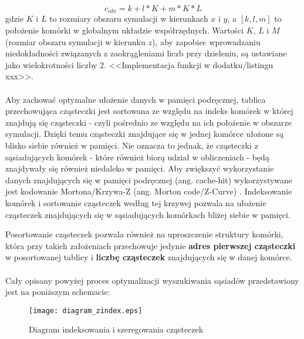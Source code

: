 \begin{equation}
c_{idx} = k + l * K + m * K * L
\label{eqn:get_cell_index}
\end{equation}
gdzie $K$ i $L$ to rozmiary obszaru symulacji w kierunkach $x$ i $y$, a $[k, l, m]$ to położenie komórki w globalnym układzie współrzędnych. Wartości $K$, $L$ i $M$ (rozmiar obszaru symulacji w kierunku $z$), aby zapobiec wprowadzaniu niedokładności związanych z zaokrągleniami liczb przy dzieleniu, są ustawiane jako wielokrotności liczby 2. <<Implementacja funkcji w dodatku/listingu xxx>>.

\paragraph{}
Aby zachować optymalne ułożenie danych w pamięci podręcznej, tablica przechowująca cząsteczki jest sortowana ze względu na indeks komórek w której znajdują się cząsteczki - czyli pośrednio ze względu na ich położenie w obszarze symulacji. Dzięki temu cząsteczki znajdujące się w jednej komórce ułożone są blisko siebie również w pamięci. Nie oznacza to jednak, że cząsteczki z sąsiadujących komórek - które również biorą udział w obliczeniach - będą znajdywały się również niedaleko w pamięci. Aby zwiększyć wykorzystanie danych znajdujących się w pamięci podręcznej (ang. cache-hit) wykorzystywane jest kodowanie Mortona/Krzywa-Z (ang. Morton code/Z-Curve) \cite{wiki:3}. Indeksowanie komórek i sortowanie cząsteczek według tej krzywej pozwala na ułożenie cząsteczek znajdujących się w sąsiadujących komórkach bliżej siebie w pamięci.
\par
Posortowanie cząsteczek pozwala również na uproszczenie struktury komórki, która przy takich założeniach przechowuje jedynie \textbf{adres pierwszej cząsteczki} w posortowanej tablicy i \textbf{liczbę cząsteczek} znajdujących się w danej komórce.
\par

\paragraph{}
Cały opisany powyżej proces optymalizacji wyszukiwania sąsiadów przedstawiony jest na poniższym schemacie:
\par
\begin{figure}[h]
\centering
\caption{Diagram indeksowania i szeregowania cząsteczek}
\texttt{[image: diagram\_zindex.eps]}
\label{fig:diagram_zindex}
\end{figure}

